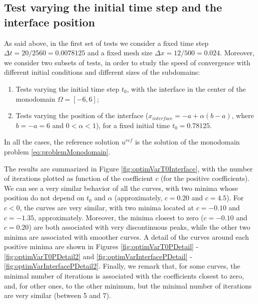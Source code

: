 \subsection{Test varying the initial time step and the interface position}

\indent As said above, in the first set of tests we consider a fixed time step $\Delta t = 20/2560 = 0.0078125$ and a fixed mesh size $\Delta x = 12/500 = 0.024$. Moreover, we consider two subsets of tests, in order to study the speed of convergence with different initial conditions and different sizes of the subdomains:

\begin{enumerate}
	\item Tests varying the initial time step $t_0$, with the interface in the center of the monodomain $\Omega = [-6,6]$;
	\item Tests varying the position of the interface ($x_{interface} = -a + \alpha (b-a)$, where $b = -a = 6$ and $0 < \alpha < 1$), for a fixed initial time $t_0 = 0.78125$.
\end{enumerate}

\indent In all the cases, the reference solution $u^{ref}$ is the solution of the monodomain problem \eqref{eq:problemMonodomain}.

\indent The results are summarized in Figure \ref{fig:optimVarT0Interface}, with the number of iterations plotted as function of the coefficient $c$ (for the positive coefficients). We can see a very similar behavior of all the curves, with two minima whose position do not depend on $t_0$ and $\alpha$ (approximately, $c = 0.20$ and $c=4.5$). For $c<0$, the curves are very similar, with two minima located at $c = -0.10$ and $c = -1.35$, approximately. Moreover, the minima closest to zero ($c=-0.10$ and $c = 0.20$) are both associated with very discontinuous peaks, while the other two minima are associated with smoother curves. A detail of the curves around each positive minima are shown in Figures \ref{fig:optimVarT0PDetail} - \ref{fig:optimVarT0PDetail2} and \ref{fig:optimVarInterfacePDetail} - \ref{fig:optimVarInterfacePDetail2}. Finally, we remark that, for some curves, the minimal number of iterations is associated with the coefficients closest to zero, and, for other ones, to the other minimum, but the minimal number of iterations are very similar (between 5 and 7).

